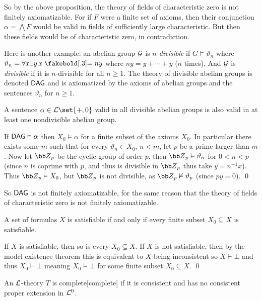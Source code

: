 \edefn

So by the above proposition, the theory of fields of characteristic zero is not finitely axiomatizable.
For if $F$ were a finite set of axioms, then their conjunction $\alpha=\bigwedge F$ would be valid in fields of sufficiently large characteristic.
But then these fields would be of characteristic zero, in contradiction.

Here is another example: an abelian group ${\cal G}$ is {\it $n$-divisible} if $G\vDash\vartheta_n$ where $\vartheta_n=\forall x\exists y\,x\eq ny$ where $ny=y+\cdots+y$ ($n$ times).
And ${\cal G}$ is {\it divisible} if it is $n$-divisible for all $n\geq1$.
The theory of divisible abelian groups is denoted ${\sf DAG}$ and is axiomatized by the axioms of abelian groups and the sentences $\vartheta_n$ for $n\geq1$.

\bprop

    A sentence $\alpha\in{\cal L}\set{+,0}$ valid in all divisible abelian groups is also valid in at least one nondivisible abelian group.

\eprop

If ${\sf DAG}\vDash\alpha$ then $X_0\vDash\alpha$ for a finite subset of the axioms $X_0$.
In particular there exists some $m$ such that for every $\vartheta_n\in X_0$, $n<m$, let $p$ be a prime larger than $m$.
Now let ${\bb Z}_p$ be the cyclic group of order $p$, then ${\bb Z}_p\vDash\vartheta_n$ for $0<n<p$ (since $n$ is coprime with $p$, and thus is divisible in ${\bb Z}_p$ thus take $y=n^{-1}x$).
Thus ${\bb Z}_p\vDash X_0$, but ${\bb Z}_p$ is not divisible, as ${\bb Z}_p\nvDash\vartheta_p$ (since $py=0$).
\qed

So ${\sf DAG}$ is not finitely axiomatizable, for the same reason that the theory of fields of characteristic zero is not finitely axiomatizable.

\bthrm[title=The Compactness Theorem, name=compactnesstheorem]

    A set of formulas $X$ is satisfiable if and only if every finite subset $X_0\subseteq X$ is satisfiable.

\ethrm

If $X$ is satisfiable, then so is every $X_0\subseteq X$.
If $X$ is not satisfiable, then by the model existence theorem this is equivalent to $X$ being inconsistent so $X\vdash\bot$ and thus $X_0\vdash\bot$ meaning $X_0\vDash\bot$ for some finite subset
$X_0\subseteq X$.
\qed

\bdefn

    An ${\cal L}$-theory $T$ is {\emphcolor complete}[complete] if it is consistent and has no consistent proper extension in ${\cal L}^0$.

